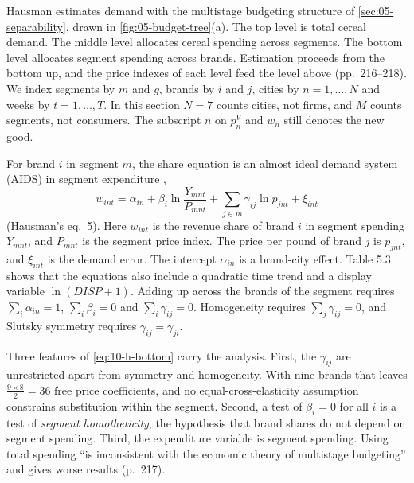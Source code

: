Hausman estimates demand with the multistage budgeting structure of \cref{sec:05-separability}, drawn in
\cref{fig:05-budget-tree}(a). The top level is total cereal demand. The middle level allocates cereal
spending across segments. The bottom level allocates segment spending across brands. Estimation proceeds
from the bottom up, and the price indexes of each level feed the level above (pp.~216--218). We index
segments by $m$ and $g$, brands by $i$ and $j$, cities by $n = 1,\dots,N$ and weeks by $t = 1,\dots,T$. In
this section $N = 7$ counts cities, not firms, and $M$ counts segments, not consumers. The subscript $n$ on
$p_n^V$ and $w_n$ still denotes the new good.

For brand $i$ in segment $m$, the share equation is an almost ideal demand system (AIDS) in segment
expenditure \citep{DeatonMuellbauer1980a},
\begin{equation}\label{eq:10-h-bottom}
  w_{int} = \alpha_{in} + \beta_i\ln\frac{Y_{mnt}}{P_{mnt}} + \sum_{j\in m}\gamma_{ij}\ln p_{jnt} + \xi_{int}
\end{equation}
(Hausman's eq.~5). Here $w_{int}$ is the revenue share of brand $i$ in segment spending $Y_{mnt}$, and
$P_{mnt}$ is the segment price index. The price per pound of brand $j$ is $p_{jnt}$, and $\xi_{int}$ is the
demand error. The intercept $\alpha_{in}$ is a brand-city effect. Table 5.3 shows that the equations also
include a quadratic time trend and a display variable $\ln(DISP + 1)$. Adding up across the brands of the
segment requires $\sum_i\alpha_{in} = 1$, $\sum_i\beta_i = 0$ and $\sum_i\gamma_{ij} = 0$. Homogeneity requires
$\sum_j\gamma_{ij} = 0$, and Slutsky symmetry requires $\gamma_{ij} = \gamma_{ji}$.

Three features of \eqref{eq:10-h-bottom} carry the analysis. First, the $\gamma_{ij}$ are unrestricted apart
from symmetry and homogeneity. With nine brands that leaves $\frac{9\times 8}{2} = 36$ free price coefficients,
and no equal-cross-elasticity assumption constrains substitution within the segment. Second, a test of
$\beta_i = 0$ for all $i$ is a test of \emph{segment homotheticity}, the hypothesis that brand shares do not
depend on segment spending. Third, the expenditure variable is segment spending. Using total spending ``is
inconsistent with the economic theory of multistage budgeting'' and gives worse results (p.~217).

